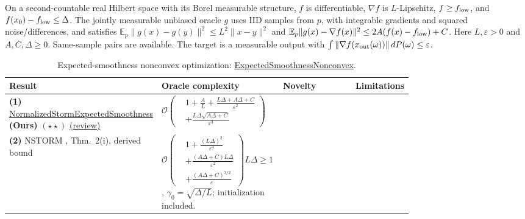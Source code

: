 \begin{table}[tp]
\centering
\caption{Expected-smoothness nonconvex optimization: \href{https://github.com/k3nfalt/longtails/blob/main/LongTails/Setups/ExpectedSmoothnessNonconvex.lean}{ExpectedSmoothnessNonconvex}.}\label{tab:ExpectedSmoothnessNonconvex}
\parbox{\linewidth}{\footnotesize On a second-countable real Hilbert space with its Borel measurable structure, $f$ is differentiable, $\nabla f$ is $L$-Lipschitz, $f\geq f_{\rm low}$, and $f(x_0)-f_{\rm low}\leq\Delta$. The jointly measurable unbiased oracle $g$ uses IID samples from $p$, with integrable gradients and squared noise/differences, and satisfies $\mathbb E_p\|g(x)-g(y)\|^2\leq L^2\|x-y\|^2$ and $\mathbb E_p\|g(x)-\nabla f(x)\|^2\leq2A(f(x)-f_{\rm low})+C$. Here $L,\varepsilon>0$ and $A,C,\Delta\geq0$. Same-sample pairs are available. The target is a measurable output with $\int\|\nabla f(x_{\rm out}(\omega))\|\,dP(\omega)\leq\varepsilon$.}\par\smallskip
\begin{threeparttable}
\footnotesize
\setlength{\tabcolsep}{4pt}\renewcommand{\arraystretch}{1.25}
\begin{tabularx}{\linewidth}{@{}>{\raggedright\arraybackslash}p{0.20\linewidth}>{\raggedright\arraybackslash}p{0.32\linewidth}>{\raggedright\arraybackslash}p{0.25\linewidth}>{\raggedright\arraybackslash}X@{}}
\toprule
\textbf{Result} & \textbf{Oracle complexity} & \textbf{Novelty} & \textbf{Limitations} \\
\midrule
\textbf{(1)} \href{https://github.com/k3nfalt/longtails/blob/main/LongTails/Theorems/NormalizedStormExpectedSmoothness.lean}{Normalized\allowbreak Storm\allowbreak Expected\allowbreak Smoothness} \textbf{(Ours)} $(\star\star)$ \href{https://github.com/k3nfalt/longtails/blob/main/scripts/reviews/NormalizedStormExpectedSmoothness.md}{(review)}
& $\mathcal{O}\!\left(\begin{aligned}&1+\frac AL+\frac{L\Delta+A\Delta+C}{\varepsilon^2}\\&+\frac{L\Delta\sqrt{A\Delta+C}}{\varepsilon^3}\end{aligned}\right)$
& & \\
\midrule[1.2pt]
\textbf{(2)} NSTORM \citep{ESNUpadhyay2026}, Thm.~2(i), derived bound
& $\mathcal{O}\!\left(\begin{aligned}&1+\frac{(L\Delta)^2}{\varepsilon^4}\\&+\frac{(A\Delta+C)L\Delta}{\varepsilon^2}\\&+\frac{(A\Delta+C)^{3/2}}{\varepsilon}\end{aligned}\right)$\newline $L\Delta\geq1$, $\gamma_0=\sqrt{\Delta/L}$; initialization included.

\end{tabularx}
\end{threeparttable}
\end{table}
